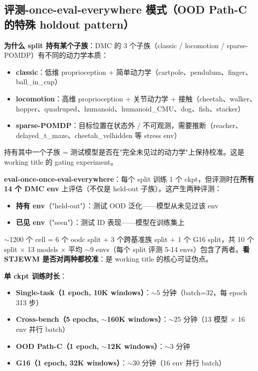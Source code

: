 \documentclass[11pt,a4paper]{article}
\begin{document}
\subsection{评测-once-eval-everywhere 模式（OOD Path-C 的特殊 holdout pattern）}

\textbf{为什么 split 持有某个子族}：DMC 的 3 个子族（classic / locomotion / sparse-POMDP）有不同的动力学本质：
\begin{itemize}[leftmargin=2em]
    \item \textbf{classic}：低维 proprioception + 简单动力学（cartpole、pendulum、finger、ball\_in\_cup）
    \item \textbf{locomotion}：高维 proprioception + 关节动力学 + 接触（cheetah、walker、hopper、quadruped、humanoid、humanoid\_CMU、dog、fish、stacker）
    \item \textbf{sparse-POMDP}：目标位置在状态外 / 不可观测，需要推断（reacher、delayed\_t\_maze、cheetah\_velhidden 等 stress env）
\end{itemize}

持有其中一个子族 = 测试模型是否在"完全未见过的动力学"上保持校准。这是 working title 的 gating experiment。

\textbf{eval-once-once-eval-everywhere}：每个 split 训练 1 个 ckpt，但评测时在\textbf{所有 14 个 DMC env} 上评估（不仅是 held-out 子族）。这产生两种评测：
\begin{itemize}[leftmargin=2em]
    \item \textbf{持有 env}（"held-out"）：测试 OOD 泛化——模型从未见过该 env
    \item \textbf{已见 env}（"seen"）：测试 ID 表现——模型在训练集上
\end{itemize}

$\sim$1200 个 cell = 6 个 oodc split + 3 个跨基准族 split + 1 个 G16 split，共 10 个 split × 13 models × 平均 $\sim$9 envs（每个 split 评测 5-14 envs）包含了两者。\textbf{看 STJEWM 是否对两种都校准}：是 working title 的核心可证伪点。

\textbf{单 ckpt 训练时长}：
\begin{itemize}[leftmargin=2em]
    \item \textbf{Single-task（1 epoch, 10K windows）}：$\sim 5$ 分钟（batch=32，每 epoch 313 步）
\item \textbf{Cross-bench（5 epochs, $\sim$160K windows）}：$\sim 25$ 分钟（13 模型 × 16 env 并行 batch）
    \item \textbf{OOD Path-C（1 epoch, $\sim$12K windows）}：$\sim 3$ 分钟
    \item \textbf{G16（1 epoch, 32K windows）}：$\sim 30$ 分钟（16 env 并行 batch）
\end{itemize}
\end{document}
